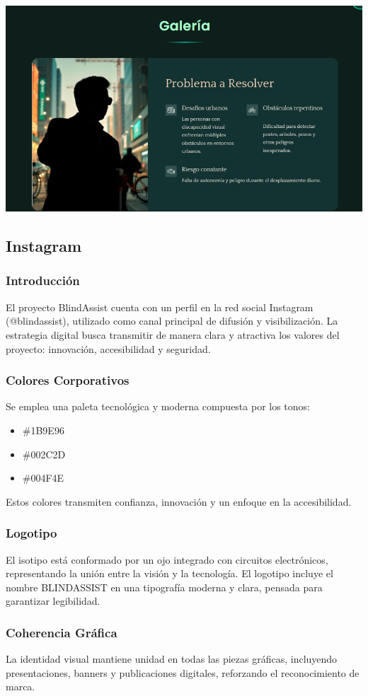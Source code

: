\documentclass[12pt,a4paper]{article}
\begin{document}
    \includegraphics[width=0.5\linewidth]{Carpeta tecnica/galeria.png}


\subsection{Instagram}

\subsubsection{Introducción}
El proyecto BlindAssist cuenta con un perfil en la red social Instagram (@blindassist), utilizado como canal principal de difusión y visibilización. La estrategia digital busca transmitir de manera clara y atractiva los valores del proyecto: innovación, accesibilidad y seguridad.


\subsubsection{Colores Corporativos}
Se emplea una paleta tecnológica y moderna compuesta por los tonos:
\begin{itemize}
    \item \textcolor{verdeagua}{\#1B9E96}
    \item \textcolor{verdeoscuro}{\#002C2D}
    \item \textcolor{verdemedio}{\#004F4E}
\end{itemize}
Estos colores transmiten confianza, innovación y un enfoque en la accesibilidad.

\subsubsection{Logotipo}
El isotipo está conformado por un ojo integrado con circuitos electrónicos, representando la unión entre la visión y la tecnología.  
El logotipo incluye el nombre BLINDASSIST en una tipografía moderna y clara, pensada para garantizar legibilidad.

\subsubsection{Coherencia Gráfica}
La identidad visual mantiene unidad en todas las piezas gráficas, incluyendo presentaciones, banners y publicaciones digitales, reforzando el reconocimiento de marca.
\end{document}
